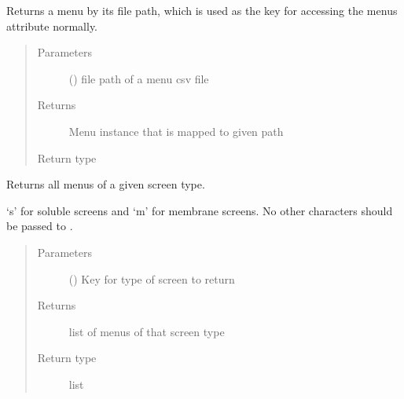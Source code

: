 \documentclass[letterpaper,10pt,english]{sphinxmanual}
\begin{document}
\begin{fulllineitems}

\begin{fulllineitems}
\label{\detokenize{polo.utils:polo.utils.io_utils.BarTender.get_menu_by_path}}
Returns a menu by its file path, which is used as the key
for accessing the menus attribute normally.
\begin{quote}\begin{description}
\item[{Parameters}] \leavevmode
{} () \textendash{} file path of a menu csv file

\item[{Returns}] \leavevmode
Menu instance that is mapped to given path

\item[{Return type}] \leavevmode
{\hyperref[\detokenize{polo.utils:polo.utils.io_utils.Menu}]{}}

\end{description}\end{quote}

\end{fulllineitems}


\begin{fulllineitems}
\label{\detokenize{polo.utils:polo.utils.io_utils.BarTender.get_menus_by_type}}
Returns all menus of a given screen type.

‘s’ for soluble screens and ‘m’ for membrane screens. No other
characters should be passed to .
\begin{quote}\begin{description}
\item[{Parameters}] \leavevmode
{} (\sphinxstyleliteralemphasis{\sphinxupquote{ (}}\sphinxstyleliteralemphasis{\sphinxupquote{)}}) \textendash{} Key for type of screen to return

\item[{Returns}] \leavevmode
list of menus of that screen type

\item[{Return type}] \leavevmode
list

\end{description}\end{quote}

\end{fulllineitems}


\end{fulllineitems}
\end{document}
